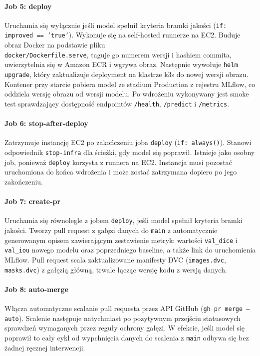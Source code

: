 \paragraph{Job 5: deploy}\mbox{}
Uruchamia się wyłącznie jeśli model spełnił kryteria bramki jakości (\texttt{if: improved == 'true'}). Wykonuje się na self-hosted runnerze na EC2. Buduje obraz Docker na podstawie pliku \\\texttt{docker/Dockerfile.serve}, taguje go numerem wersji i hashiem commita, uwierzytelnia się w Amazon ECR i wgrywa obraz. Następnie wywołuje \texttt{helm upgrade}, który zaktualizuje deployment na klastrze k3s do nowej wersji obrazu. Kontener przy starcie pobiera model ze stadium Production z rejestru MLflow, co oddziela wersję obrazu od wersji modelu. Po wdrożeniu wykonywany jest smoke test sprawdzający dostępność endpointów \texttt{/health}, \texttt{/predict} i \texttt{/metrics}.

\paragraph{Job 6: stop-after-deploy}\mbox{}
Zatrzymuje instancję EC2 po zakończeniu joba \texttt{deploy} (\texttt{if: always()}). Stanowi odpowiednik \texttt{stop-infra} dla ścieżki, gdy model się poprawił. Istnieje jako osobny job, ponieważ \texttt{deploy} korzysta z runnera na EC2. Instancja musi pozostać uruchomiona do końca wdrożenia i może zostać zatrzymana dopiero po jego zakończeniu.

\paragraph{Job 7: create-pr}\mbox{}
Uruchamia się równolegle z jobem \texttt{deploy}, jeśli model spełnił kryteria bramki jakości. Tworzy pull request z gałęzi danych do \texttt{main} z automatycznie generowanym opisem zawierającym zestawienie metryk: wartości \texttt{val\_dice} i \texttt{val\_iou} nowego modelu oraz poprzedniego baseline, a także link do uruchomienia MLflow. Pull request scala zaktualizowane manifesty DVC (\texttt{images.dvc}, \texttt{masks.dvc}) z gałęzią główną, trwale łącząc wersję kodu z wersją danych.

\paragraph{Job 8: auto-merge}\mbox{}
Włącza automatyczne scalanie pull requesta przez API GitHub (\texttt{gh pr merge --auto}). Scalenie następuje natychmiast po pozytywnym przejściu statusowych sprawdzeń wymaganych przez reguły ochrony gałęzi. W efekcie, jeśli model się poprawił to cały cykl od wypchnięcia danych do scalenia z \texttt{main} odbywa się bez żadnej ręcznej interwencji.

